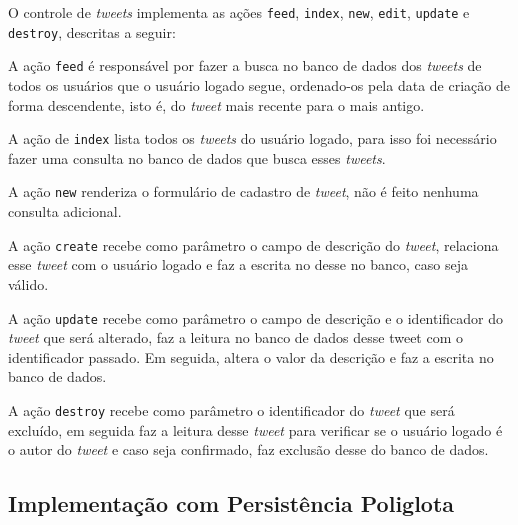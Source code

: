 O controle de \textit{tweets} implementa as ações \verb|feed|, \verb|index|, \verb|new|, \verb|edit|, \verb|update| e \verb|destroy|, descritas a seguir:

A ação \verb|feed| é responsável por fazer a busca no banco de dados dos \textit{tweets} de todos os usuários que o usuário logado segue, ordenado-os pela data de criação de forma descendente, isto é, do \textit{tweet} mais recente para o mais antigo.

A ação de \verb|index| lista todos os \textit{tweets} do usuário logado, para isso foi necessário fazer uma consulta no banco de dados que busca esses \textit{tweets}.

A ação \verb|new| renderiza o formulário de cadastro de \textit{tweet}, não é feito nenhuma consulta adicional.

A ação \verb|create| recebe como parâmetro o campo de descrição do \textit{tweet}, relaciona esse \textit{tweet} com o usuário logado e faz a escrita no desse no banco, caso seja válido.

A ação \verb|update| recebe como parâmetro o campo de descrição e o identificador do \textit{tweet} que será alterado, faz a leitura no banco de dados desse tweet com o identificador passado. Em seguida, altera o valor da descrição e faz a escrita no banco de dados.

A ação \verb|destroy| recebe como parâmetro o identificador do \textit{tweet} que será excluído, em seguida faz a leitura desse \textit{tweet} para verificar se o usuário logado é o autor do \textit{tweet} e caso seja confirmado, faz exclusão desse do banco de dados.


\subsection{Implementação com Persistência Poliglota}
\label{subsec:polyglot}

